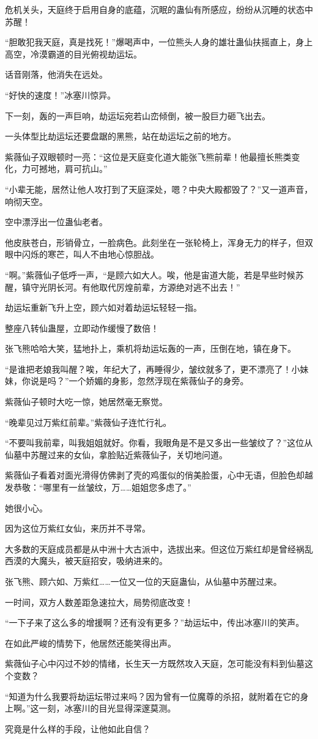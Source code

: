 \begin{this_body}
危机关头，天庭终于启用自身的底蕴，沉眠的蛊仙有所感应，纷纷从沉睡的状态中苏醒！

“胆敢犯我天庭，真是找死！”爆喝声中，一位熊头人身的雄壮蛊仙扶摇直上，身上高空，冷漠霸道的目光俯视劫运坛。

话音刚落，他消失在远处。

“好快的速度！”冰塞川惊异。

下一刻，轰的一声巨响，劫运坛宛若山峦倾倒，被一股巨力砸飞出去。

一头体型比劫运坛还要盘踞的黑熊，站在劫运坛之前的地方。

紫薇仙子双眼顿时一亮：“这位是天庭变化道大能张飞熊前辈！他最擅长熊类变化，力可撼地，肩可抗山。”

“小辈无能，居然让他人攻打到了天庭深处，嗯？中央大殿都毁了？”又一道声音，响彻天空。

空中漂浮出一位蛊仙老者。

他皮肤苍白，形销骨立，一脸病色。此刻坐在一张轮椅上，浑身无力的样子，但双眼中闪烁的寒芒，叫人不由地心惊胆战。

“啊。”紫薇仙子低呼一声，“是顾六如大人。唉，他是宙道大能，若是早些时候苏醒，镇守光阴长河。有他取代厉煌前辈，方源绝对逃不出去！”

劫运坛重新飞升上空，顾六如对着劫运坛轻轻一指。

整座八转仙蛊屋，立即动作缓慢了数倍！

张飞熊哈哈大笑，猛地扑上，乘机将劫运坛轰的一声，压倒在地，镇在身下。

“是谁把老娘我叫醒？唉，年纪大了，再睡得少，皱纹就多了，更不漂亮了！小妹妹，你说是吗？”一个娇媚的身影，忽然浮现在紫薇仙子的身旁。

紫薇仙子顿时大吃一惊，她居然毫无察觉。

“晚辈见过万紫红前辈。”紫薇仙子连忙行礼。

“不要叫我前辈，叫我姐姐就好。你看，我眼角是不是又多出一些皱纹了？”这位从仙墓中苏醒过来的女仙，拿脸贴近紫薇仙子，关切地问道。

紫薇仙子看着对面光滑得仿佛剥了壳的鸡蛋似的俏美脸蛋，心中无语，但脸色却越发恭敬：“哪里有一丝皱纹，万……姐姐您多虑了。”

她很小心。

因为这位万紫红女仙，来历并不寻常。

大多数的天庭成员都是从中洲十大古派中，选拔出来。但这位万紫红却是曾经祸乱西漠的大魔头，被天庭招安，吸纳进来的。

张飞熊、顾六如、万紫红……一位又一位的天庭蛊仙，从仙墓中苏醒过来。

一时间，双方人数差距急速拉大，局势彻底改变！

“一下子来了这么多的增援啊？还有没有更多？”劫运坛中，传出冰塞川的笑声。

在如此严峻的情势下，他居然还能笑得出声。

紫薇仙子心中闪过不妙的情绪，长生天一方既然攻入天庭，怎可能没有料到仙墓这个变数？

“知道为什么我要将劫运坛带过来吗？因为曾有一位魔尊的杀招，就附着在它的身上啊。”这一刻，冰塞川的目光显得深邃莫测。

究竟是什么样的手段，让他如此自信？

\end{this_body}

